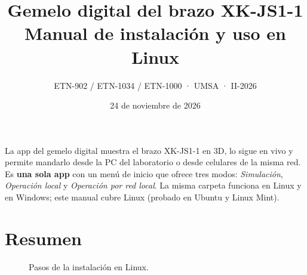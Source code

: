 \documentclass[a4paper,11pt]{article}
\title{\textbf{Gemelo digital del brazo XK-JS1-1}\\[4pt]\large Manual de instalación y uso en Linux}
\author{ETN-902 / ETN-1034 / ETN-1000 · UMSA · II-2026}
\date{24 de noviembre de 2026}
\begin{document}
\maketitle
\thispagestyle{fancy}

La app del gemelo digital muestra el brazo XK-JS1-1 en 3D, lo sigue en vivo y permite mandarlo desde la PC del laboratorio o desde celulares de la misma red. Es \textbf{una sola app} con un menú de inicio que ofrece tres modos: \emph{Simulación}, \emph{Operación local} y \emph{Operación por red local}. La misma carpeta funciona en Linux y en Windows; este manual cubre Linux (probado en Ubuntu y Linux Mint).

\tableofcontents
\newpage

\section{Resumen}
\begin{figure}[H]
\centering
{}
\caption{Pasos de la instalación en Linux.}
\end{figure}

\end{document}
